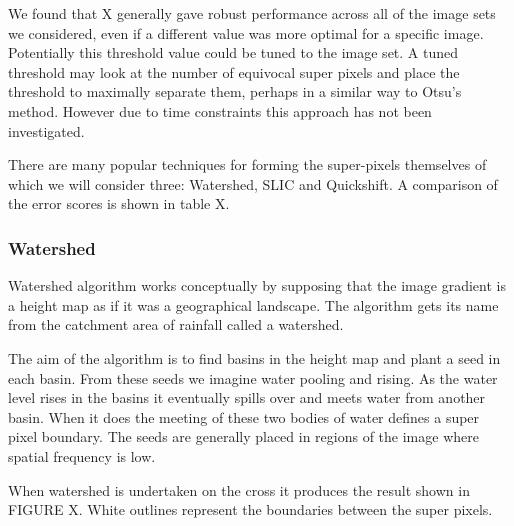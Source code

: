 \documentclass[12pt]{IIBproject}
\begin{document}
We found that X generally gave robust performance across all of the image sets we considered, even if a different value was more optimal for a specific image. Potentially this threshold value could be tuned to the image set. A tuned threshold may look at the number of equivocal super pixels and place the threshold to maximally separate them, perhaps in a similar way to Otsu's method. However due to time constraints this approach has not been investigated. 

There are many popular techniques for forming the super-pixels themselves of which we will consider three: Watershed, SLIC and Quickshift. A comparison of the error scores is shown in table X.



\subsubsection{Watershed}
Watershed algorithm works conceptually by supposing that the image gradient is a height map as if it was a geographical landscape. The algorithm gets its name from the catchment area of rainfall called a watershed. 

The aim of the algorithm is to find basins in the height map and plant a seed in each basin. From these seeds we imagine water pooling and rising. As the water level rises in the basins it eventually spills over and meets water from another basin. When it does the meeting of these two bodies of water defines a super pixel boundary. The seeds are generally placed in regions of the image where spatial frequency is low.
 
When watershed is undertaken on the cross it produces the result shown in FIGURE X. White outlines represent the boundaries between the super pixels.
\end{document}
